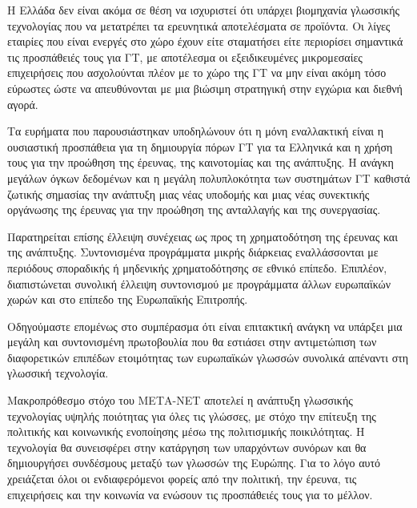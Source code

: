 \begin{multicols}{2}
Η Ελλάδα δεν είναι ακόμα σε θέση να ισχυριστεί ότι υπάρχει βιομηχανία γλωσσικής τεχνολογίας που να μετατρέπει τα ερευνητικά αποτελέσματα σε προϊόντα. Οι λίγες εταιρίες που είναι ενεργές στο χώρο έχουν είτε σταματήσει είτε περιορίσει σημαντικά τις προσπάθειές τους για ΓΤ, με αποτέλεσμα οι εξειδικευμένες μικρομεσαίες επιχειρήσεις που ασχολούνται πλέον με το χώρο της ΓΤ να μην είναι ακόμη τόσο εύρωστες ώστε να απευθύνονται με μια  βιώσιμη στρατηγική στην εγχώρια και διεθνή αγορά. 

Τα ευρήματα που παρουσιάστηκαν υποδηλώνουν ότι η μόνη εναλλακτική είναι η ουσιαστική προσπάθεια για τη δημιουργία πόρων ΓΤ για τα Ελληνικά και η χρήση τους για την προώθηση της έρευνας, της καινοτομίας και της ανάπτυξης. Η ανάγκη μεγάλων όγκων δεδομένων και η μεγάλη πολυπλοκότητα των συστημάτων ΓΤ καθιστά ζωτικής σημασίας την ανάπτυξη μιας νέας υποδομής και μιας νέας συνεκτικής οργάνωσης της έρευνας για την προώθηση της ανταλλαγής και της συνεργασίας.

Παρατηρείται επίσης έλλειψη συνέχειας ως προς τη χρηματοδότηση της έρευνας και της ανάπτυξης. Συντονισμένα προγράμματα μικρής διάρκειας εναλλάσσονται με περιόδους σποραδικής ή μηδενικής χρηματοδότησης σε εθνικό επίπεδο. Επιπλέον, διαπιστώνεται συνολική έλλειψη συντονισμού με προγράμματα άλλων ευρωπαϊκών χωρών και στο επίπεδο της Ευρωπαϊκής Επιτροπής.

Οδηγούμαστε επομένως στο συμπέρασμα ότι είναι επιτακτική ανάγκη να υπάρξει μια μεγάλη και συντονισμένη πρωτοβουλία που θα εστιάσει στην αντιμετώπιση των διαφορετικών επιπέδων ετοιμότητας των ευρωπαϊκών γλωσσών συνολικά απέναντι στη γλωσσική τεχνολογία. 

Μακροπρόθεσμο στόχο του ΜΕΤΑ-ΝΕΤ αποτελεί η ανάπτυξη γλωσσικής τεχνολογίας υψηλής ποιότητας για όλες τις γλώσσες, με στόχο την επίτευξη της πολιτικής και κοινωνικής ενοποίησης μέσω της πολιτισμικής ποικιλότητας. Η τεχνολογία θα συνεισφέρει στην κατάργηση των υπαρχόντων συνόρων και θα δημιουργήσει συνδέσμους μεταξύ των γλωσσών της Ευρώπης. Για το λόγο αυτό χρειάζεται όλοι οι ενδιαφερόμενοι φορείς  από την πολιτική, την έρευνα, τις επιχειρήσεις και την κοινωνία να ενώσουν τις προσπάθειές τους για το μέλλον.
\end{multicols}

\clearpage

